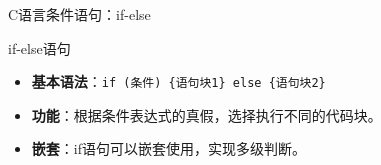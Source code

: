 \documentclass[UTF8,aspectratio=169]{beamer}
\begin{document}
\begin{frame}[fragile]{C语言条件语句：if-else}
    \begin{ytublock}{if-else语句}
        \begin{itemize}
            \item \textbf{基本语法}：\texttt{if (条件) \{语句块1\} else \{语句块2\}}
            \item \textbf{功能}：根据条件表达式的真假，选择执行不同的代码块。
            \item \textbf{嵌套}：if语句可以嵌套使用，实现多级判断。
        \end{itemize}
    \end{ytublock}
    \begin{columns}
        \begin{column}{0.48\textwidth}
            \inputminted[firstline=9,lastline=17]{cpp}{code/c_control_structures.c}
        \end{column}
        \begin{column}{0.48\textwidth}
            \inputminted[firstline=19,lastline=26]{cpp}{code/c_control_structures.c}
        \end{column}
    \end{columns}
\end{frame}
\end{document}
